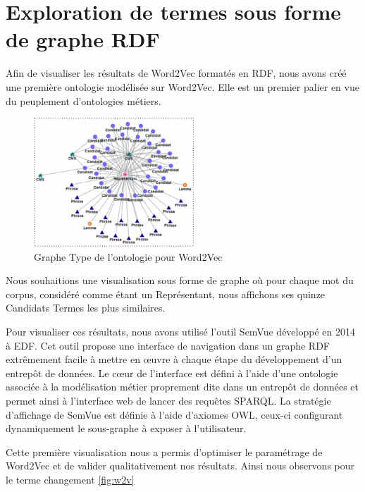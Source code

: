 \section{Exploration de termes sous forme de graphe RDF}

Afin de visualiser les résultats de Word2Vec formatés en RDF, nous avons créé une première ontologie modélisée sur Word2Vec. Elle est un premier palier en vue du peuplement d'ontologies métiers.

\begin{figure}[tb]
    \begin{center}
        \includegraphics[width=6cm]{figures/gtype}
    \end{center}
    \caption{Graphe Type de l’ontologie pour Word2Vec}\label{fig:gtype}
\end{figure}


Nous souhaitions une visualisation sous forme de graphe où pour chaque mot du corpus, considéré comme étant un Représentant, nous affichons ses quinze Candidats Termes les plus similaires.

Pour visualiser ces résultats, nous avons utilisé l'outil SemVue développé en 2014 à EDF. Cet outil propose une interface de navigation dans un graphe RDF extrêmement facile à mettre en œuvre à chaque étape du développement d’un entrepôt de données. Le cœur de l’interface est défini à l’aide d’une ontologie associée à la modélisation métier proprement dite dans un entrepôt de données \cite{mnpho14parallel-materialisation-RDFox} et permet ainsi à l’interface web de lancer des requêtes SPARQL. La stratégie d’affichage de SemVue est définie à l’aide d’axiomes OWL, ceux-ci configurant dynamiquement le sous-graphe à exposer à l’utilisateur.

Cette première visualisation nous a permis d'optimiser le paramétrage de Word2Vec et de valider qualitativement nos résultats. Ainsi nous observons pour le terme changement \ref{fig:w2v}

